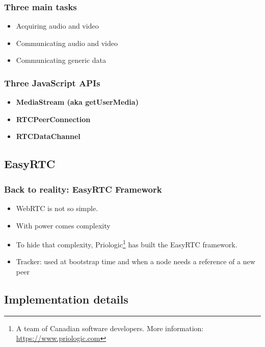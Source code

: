 \documentclass{beamer}
\begin{document}
\begin{frame}\frametitle{Three main tasks}
\begin{itemize}
  \item Acquiring audio and video
  \item Communicating audio and video
  \item Communicating generic data
\end{itemize}    
\end{frame}

\begin{frame}\frametitle{Three JavaScript APIs}

\begin{itemize}
  \item\textbf{\textsf{MediaStream} (aka getUserMedia)}
  \item\textbf{\textsf{RTCPeerConnection}}
  \item\textbf{\textsf{RTCDataChannel}}
\end{itemize}
\end{frame}

\subsection{EasyRTC}

\begin{frame}\frametitle{Back to reality: EasyRTC Framework}
\begin{itemize}
  \item WebRTC is not so simple.
  \item With power comes complexity
  \item To hide that complexity, Priologic\footnote{A team of Canadian software developers. More information: \url{https://www.priologic.com}} has built the EasyRTC framework.
  \item Tracker: used at bootstrap time and when a node needs a reference of a new peer
\end{itemize}
\end{frame}

\subsection{Implementation details}
\end{document}
